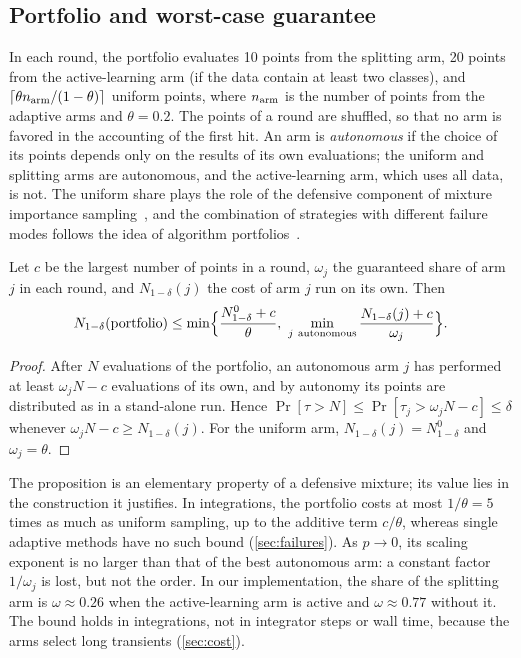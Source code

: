 \subsection{Portfolio and worst-case guarantee}\label{sec:portfolio}

In each round, the portfolio evaluates 10 points from the splitting arm, 20 points from the active-learning arm (if the data contain at least two classes), and $\lceil\theta n_{\rm arm}/(1-\theta)\rceil$ uniform points, where $n_{\rm arm}$ is the number of points from the adaptive arms and $\theta=0.2$. The points of a round are shuffled, so that no arm is favored in the accounting of the first hit. An arm is \emph{autonomous} if the choice of its points depends only on the results of its own evaluations; the uniform and splitting arms are autonomous, and the active-learning arm, which uses all data, is not. The uniform share plays the role of the defensive component of mixture importance sampling~\cite{Hesterberg1995}, and the combination of strategies with different failure modes follows the idea of algorithm portfolios~\cite{Huberman1997,GomesSelman2001}.

\begin{proposition}\label{prop:portfolio}
Let $c$ be the largest number of points in a round, $\omega_j$ the guaranteed share of arm $j$ in each round, and $N_{1-\delta}(j)$ the cost of arm $j$ run on its own. Then
\begin{equation}
N_{1-\delta}(\text{portfolio})\le\min\Bigl\{\frac{N^0_{1-\delta}+c}{\theta},\ \min_{j\ \text{autonomous}}\frac{N_{1-\delta}(j)+c}{\omega_j}\Bigr\}.
\label{eq:portfolio}
\end{equation}
\end{proposition}

\begin{proof}
After $N$ evaluations of the portfolio, an autonomous arm $j$ has performed at least $\omega_jN-c$ evaluations of its own, and by autonomy its points are distributed as in a stand-alone run. Hence $\Pr[\tau>N]\le\Pr[\tau_j>\omega_jN-c]\le\delta$ whenever $\omega_jN-c\ge N_{1-\delta}(j)$. For the uniform arm, $N_{1-\delta}(j)=N^0_{1-\delta}$ and $\omega_j=\theta$.
\end{proof}

The proposition is an elementary property of a defensive mixture; its value lies in the construction it justifies. In integrations, the portfolio costs at most $1/\theta=5$ times as much as uniform sampling, up to the additive term $c/\theta$, whereas single adaptive methods have no such bound (\cref{sec:failures}). As $p\to0$, its scaling exponent is no larger than that of the best autonomous arm: a constant factor $1/\omega_j$ is lost, but not the order. In our implementation, the share of the splitting arm is $\omega\approx0.26$ when the active-learning arm is active and $\omega\approx0.77$ without it. The bound holds in integrations, not in integrator steps or wall time, because the arms select long transients (\cref{sec:cost}).

